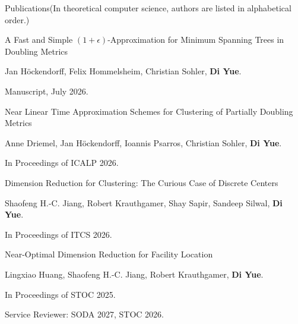 \documentclass{resume} %
\begin{document}
\begin{rSection}{Publications}{(In theoretical computer science, authors are listed in alphabetical order.)}
    \begin{pubSubsection}{A Fast and Simple $(1 + \epsilon)$-Approximation for Minimum
    Spanning Trees in Doubling Metrics}
        \item Jan H\"ockendorff, Felix Hommelsheim, Christian Sohler, \textbf{Di Yue}.
        \item Manuscript, July 2026.
    \end{pubSubsection}

    \begin{pubSubsection}{Near Linear Time Approximation Schemes for
    Clustering of Partially Doubling Metrics}
        \item Anne Driemel, Jan H\"ockendorff, Ioannis Psarros, Christian Sohler, \textbf{Di Yue}.
        \item In Proceedings of ICALP 2026.
    \end{pubSubsection}

    \begin{pubSubsection}{Dimension Reduction for Clustering: The Curious Case of Discrete Centers}
        \item Shaofeng H.-C. Jiang, Robert Krauthgamer, Shay Sapir, Sandeep Silwal, \textbf{Di Yue}.
        \item In Proceedings of ITCS 2026.
    \end{pubSubsection}

    \begin{pubSubsection}{Near-Optimal Dimension Reduction for Facility Location}
        \item Lingxiao Huang, Shaofeng H.-C. Jiang, Robert Krauthgamer, \textbf{Di Yue}.
        \item In Proceedings of STOC 2025.
    \end{pubSubsection}
\end{rSection}

\begin{rSection}{Service}{}
    Reviewer: SODA 2027, STOC 2026.
\end{rSection}
\end{document}
